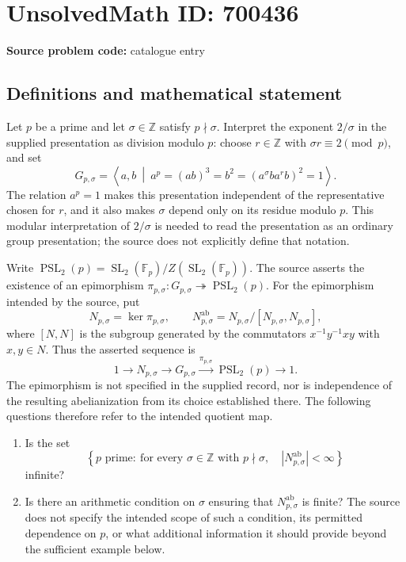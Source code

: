 \documentclass[11pt]{article}
\newcommand{\Z}{\mathbb{Z}}
\newcommand{\F}{\mathbb{F}}
\begin{document}
\section*{UnsolvedMath ID: 700436}
\textbf{Source problem code:} catalogue entry
\subsection{Definitions and mathematical statement}
Let \(p\) be a prime and let \(\sigma\in\Z\) satisfy \(p\nmid\sigma\). Interpret the exponent \(2/\sigma\) in the supplied presentation as division modulo \(p\): choose \(r\in\Z\) with \(\sigma r\equiv2\pmod p\), and set
\[
G_{p,\sigma}=\left\langle a,b\ \middle|\ a^p=(ab)^3=b^2=(a^\sigma b a^r b)^2=1\right\rangle.
\]
The relation \(a^p=1\) makes this presentation independent of the representative chosen for \(r\), and it also makes \(\sigma\) depend only on its residue modulo \(p\). This modular interpretation of \(2/\sigma\) is needed to read the presentation as an ordinary group presentation; the source does not explicitly define that notation.

Write \(\operatorname{PSL}_2(p)=\operatorname{SL}_2(\F_p)/Z(\operatorname{SL}_2(\F_p))\). The source asserts the existence of an epimorphism \(\pi_{p,\sigma}:G_{p,\sigma}\twoheadrightarrow\operatorname{PSL}_2(p)\). For the epimorphism intended by the source, put
\[
N_{p,\sigma}=\ker\pi_{p,\sigma},\qquad
N_{p,\sigma}^{\mathrm{ab}}=N_{p,\sigma}/[N_{p,\sigma},N_{p,\sigma}],
\]
where \([N,N]\) is the subgroup generated by the commutators \(x^{-1}y^{-1}xy\) with \(x,y\in N\). Thus the asserted sequence is
\[
1\longrightarrow N_{p,\sigma}\longrightarrow G_{p,\sigma}
\xrightarrow{\pi_{p,\sigma}}\operatorname{PSL}_2(p)\longrightarrow1.
\]
The epimorphism is not specified in the supplied record, nor is independence of the resulting abelianization from its choice established there. The following questions therefore refer to the intended quotient map.

\begin{enumerate}
\item[(a)] Is the set
\[
\left\{p\text{ prime}:\ \text{for every }\sigma\in\Z\text{ with }p\nmid\sigma,\quad |N_{p,\sigma}^{\mathrm{ab}}|<\infty\right\}
\]
infinite?
\item[(b)] Is there an arithmetic condition on \(\sigma\) ensuring that \(N_{p,\sigma}^{\mathrm{ab}}\) is finite? The source does not specify the intended scope of such a condition, its permitted dependence on \(p\), or what additional information it should provide beyond the sufficient example below.
\end{enumerate}
\end{document}
